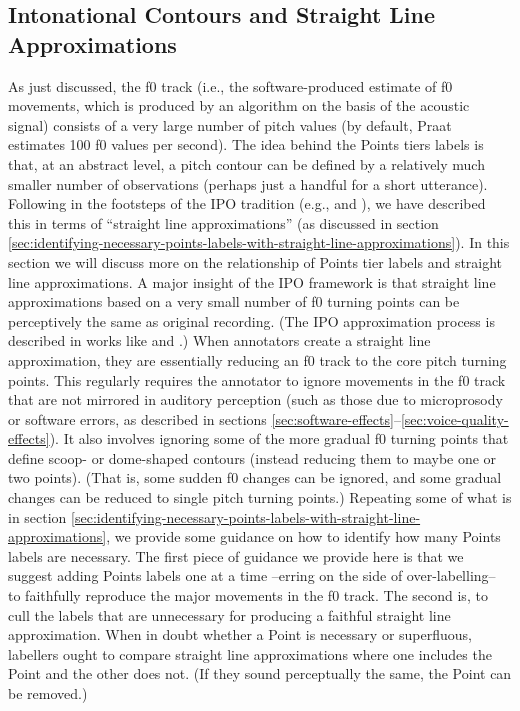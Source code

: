 \documentclass[11pt, twoside]{memoir}
\begin{document}
{{{\subsection{Intonational Contours and Straight Line Approximations}\label{sec:intonational-contours-and-straight-line-approximations}
As just discussed, the f0 track (i.e., the software-produced estimate of f0 movements, which is produced by an algorithm on the basis of the acoustic signal) consists of a very large number of pitch values (by default, Praat estimates 100 f0 values per second). The idea behind the Points tiers labels is that, at an abstract level, a pitch contour can be defined by a relatively much smaller number of observations (perhaps just a handful for a short utterance). Following in the footsteps of the IPO tradition (e.g., \citealt{t-hartcollier75} and \citealt{t-hart-90}), we have described this in terms of “straight line approximations” (as discussed in section \ref{sec:identifying-necessary-points-labels-with-straight-line-approximations}). In this section we will discuss more on the relationship of Points tier labels and straight line approximations.
A major insight of the IPO framework is that straight line approximations based on a very small number of f0 turning points can be perceptively the same as original recording. (The IPO approximation process is described in works like \citealt{dutoit97} and \citealt{rao12}.) When annotators create a straight line approximation, they are essentially reducing an f0 track to the core pitch turning points. This regularly requires the annotator to ignore movements in the f0 track that are not mirrored in auditory perception (such as those due to microprosody or software errors, as described in sections \ref{sec:software-effects}–\ref{sec:voice-quality-effects}). It also involves ignoring some of the more gradual f0 turning points that define scoop- or dome-shaped contours (instead reducing them to maybe one or two points). (That is, some sudden f0 changes can be ignored, and some gradual changes can be reduced to single pitch turning points.) Repeating some of what is in section \ref{sec:identifying-necessary-points-labels-with-straight-line-approximations}, we provide some guidance on how to identify how many Points labels are necessary. The first piece of guidance we provide here is that we suggest adding Points labels one at a time –erring on the side of over-labelling– to faithfully reproduce the major movements in the f0 track. The second is, to cull the labels that are unnecessary for producing a faithful straight line approximation. When in doubt whether a Point is necessary or superfluous, labellers ought to compare straight line approximations where one includes the Point and the other does not. (If they sound perceptually the same, the Point can be removed.) 
}}}
\end{document}
